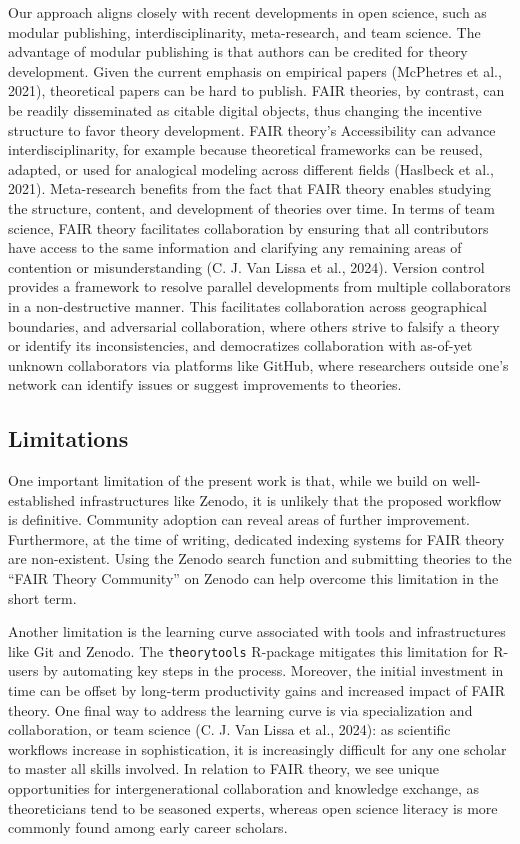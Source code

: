 \documentclass[
  man, noextraspace,floatsintext]{apa7}
\begin{document}
Our approach aligns closely with recent developments in open science,
such as modular publishing, interdisciplinarity, meta-research, and team science.
The advantage of modular publishing is that authors can be credited for theory development.
Given the current emphasis on empirical papers (McPhetres et al., 2021), theoretical papers can be hard to publish.
FAIR theories, by contrast, can be readily disseminated as citable digital objects, thus changing the incentive structure to favor theory development.
FAIR theory's Accessibility can advance interdisciplinarity,
for example because theoretical frameworks can be reused, adapted, or used for analogical modeling across different fields (Haslbeck et al., 2021).
Meta-research benefits from the fact that FAIR theory enables studying the structure, content, and development of theories over time.
In terms of team science, FAIR theory facilitates collaboration by ensuring that all contributors have access to the same information and
clarifying any remaining areas of contention or misunderstanding (C. J. Van Lissa et al., 2024).
Version control provides a framework to resolve parallel developments from multiple collaborators in a non-destructive manner.
This facilitates collaboration across geographical boundaries,
and adversarial collaboration, where others strive to falsify a theory or identify its inconsistencies, and democratizes collaboration with as-of-yet unknown collaborators via platforms like GitHub, where researchers outside one's network can identify issues or suggest improvements to theories.

\subsection{Limitations}\label{limitations}

One important limitation of the present work is that,
while we build on well-established infrastructures like Zenodo,
it is unlikely that the proposed workflow is definitive.
Community adoption can reveal areas of further improvement.
Furthermore, at the time of writing, dedicated indexing systems for FAIR theory are non-existent.
Using the Zenodo search function and submitting theories to the ``FAIR Theory Community'' on Zenodo can help overcome this limitation in the short term.

\label{learningcurve}{Another limitation is the learning curve associated with tools and infrastructures like Git and Zenodo.
The \texttt{theorytools} R-package mitigates this limitation for R-users by automating key steps in the process.
Moreover, the initial investment in time can be offset by long-term productivity gains and increased impact of FAIR theory.
One final way to address the learning curve is via specialization and collaboration, or team science (C. J. Van Lissa et al., 2024):
as scientific workflows increase in sophistication, it is increasingly difficult for any one scholar to master all skills involved.
In relation to FAIR theory, we see unique opportunities for intergenerational collaboration and knowledge exchange,
as theoreticians tend to be seasoned experts, whereas open science literacy is more commonly found among early career scholars.}
\end{document}
